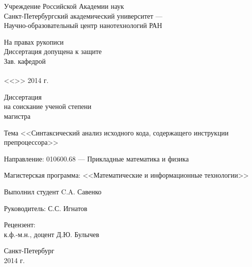 \begin{titlepage}
\newpage

\begin{center}
Учреждение Российской Академии наук \\
Санкт-Петербургский академический университет --- \\
Научно-образовательный центр нанотехнологий РАН \\
\end{center}

\begin{flushright}
\begin{minipage}[t][12em][c]{30ex}
\begin{center}
На правах рукописи \\
\medskip
Диссертация допущена к защите \\
Зав. кафедрой \\
\hrulefill \\
<<\hspace{2em}>> \hspace{1ex} \hrulefill \hspace{1ex} 2014 г.\\
\end{center}
\end{minipage}
\end{flushright}

\begin{center}
Диссертация \\
на соискание ученой степени \\
магистра \\
\end{center}

\begin{flushleft}
Тема <<Синтаксический анализ исходного кода, содержащего инструкции препроцессора>>
\end{flushleft}

\begin{flushleft}
Направление: 010600.68 --- Прикладные математика и физика
\end{flushleft}

\begin{flushleft}
Магистерская программа: <<Математические и информационные технологии>>
\end{flushleft}

\begin{flushleft}
Выполнил студент \hfill C.A. Савенко
\end{flushleft}

\begin{flushleft}
Руководитель: \hfill С.С. Игнатов
\end{flushleft}

\begin{flushleft}
Рецензент: \\
к.ф.-м.н., доцент \hfill Д.Ю. Булычев
\end{flushleft}

\vspace{\fill}

\begin{center}
Санкт-Петербург \\
2014 г. \\
\end{center}

\end{titlepage}
